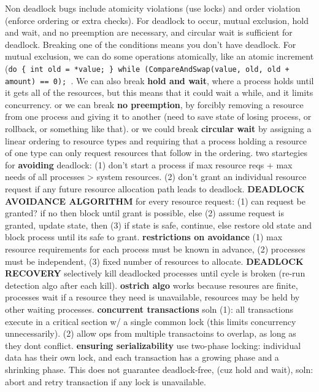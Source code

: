 Non deadlock bugs include atomicity violations (use locks) and order violation
(enforce ordering or extra checks). For deadlock to occur, mutual exclusion,
hold and wait, and no preemption are necessary, and circular wait is sufficient
for deadlock. Breaking one of the conditions means you don't have deadlock. For
mutual exclusion, we can do some operations atomically, like an atomic increment ({\tt do \{ int
old = *value; \} while (CompareAndSwap(value, old, old + amount) == 0); }.
We can also break {\bf hold and wait}, where a process holds until it gets all
of the resources, but this means that it could wait a while, and it limits
concurrency. or we can break {\bf no preemption}, by forcibly removing a
resource from one process and giving it to another (need to save state of
losing process, or rollback, or something like that). or we could break {\bf
circular wait} by assigning a linear ordering to resource types and requiring
that a process holding a resource of one type can only request resources that
follow in the ordering. two startegies for {\bf avoiding} deadlock: (1) don't
start a process if max resource reqs + max needs of all processes > system
resources. (2) don't grant an individual resource request if any future
resource allocation path leads to deadlock. {\bf DEADLOCK AVOIDANCE ALGORITHM}
for every resource request: (1) can request be granted? if no then block until
grant is possible, else (2) assume request is granted, update state, then (3)
if state is safe, continue, else restore old state and block process until its
safe to grant. {\bf restrictions on avoidance} (1) max resource requirements
for each process must be known in advance, (2) processes must be independent,
(3) fixed number of resources to allocate. {\bf DEADLOCK RECOVERY} selectively
kill deadlocked processes until cycle is broken (re-run detection algo after
each kill).  {\bf ostrich algo } works because resoures are finite, processes
wait if a resource they need is unavailable, resources may be held by other
waiting processes.
{\bf concurrent transactions} soln (1): all transactions execute in a critical
section w/ a single common lock (this limits concurrency unnecessarily). (2)
allow ops from multiple transactoins to overlap, as long as they dont conflict.
{\bf ensuring serializability} use two-phase locking: individual data has their
own lock, and each transaction has a growing phase and a shrinking phase. This
does not guarantee deadlock-free, (cuz hold and wait), soln: abort and retry
transaction if any lock is unavailable.
